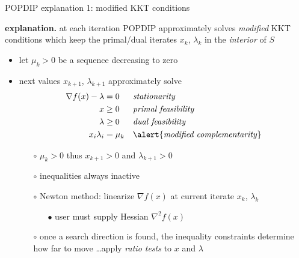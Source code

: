 \documentclass[10pt,hyperref,dvipsnames]{beamer}
\newcommand{\grad}{\nabla}
\begin{document}
\begin{frame}{POPDIP explanation 1: modified KKT conditions}

\textbf{explanation.}  at each iteration POPDIP approximately solves \emph{modified} KKT conditions which keep the primal/dual iterates $x_k$, $\lambda_k$ in the \emph{interior} of $S$

\bigskip
\begin{itemize}
\item let $\mu_k>0$ be a sequence decreasing to zero
\item next values $x_{k+1}$, $\lambda_{k+1}$ approximately solve
\begin{align*}
\grad f(x) - \lambda &= 0   &&\text{\emph{stationarity}} \\
                   x &\ge 0 &&\text{\emph{primal feasibility}} \\
             \lambda &\ge 0 &&\text{\emph{dual feasibility}} \\
       x_i \lambda_i &= \mu_k && \text{\alert{\emph{modified complementarity}}}
\end{align*}

    \begin{itemize}
    \item[$\circ$] $\mu_k>0$ thus $x_{k+1} > 0$ and $\lambda_{k+1} > 0$
    \item[$\circ$] inequalities always inactive
    \item[$\circ$] Newton method: linearize $\grad f(x)$ at current iterate $x_k$, $\lambda_k$ {\large\strut}
        \begin{itemize}
        \item[$\bullet$] user must supply Hessian $\grad^2 f(x)$
        \end{itemize}
    \item[$\circ$] once a search direction is found, the inequality constraints determine how far to move \dots \quad apply \emph{ratio tests} to $x$ and $\lambda$
    \end{itemize}
\end{itemize}
\end{frame}
\end{document}
